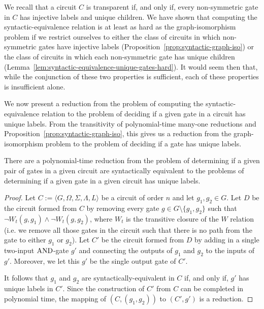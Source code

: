 \documentclass[../main/thesis.tex]{subfiles}
\begin{document}
We recall that a circuit $C$ is transparent if, and only if, every non-symmetric
gate in $C$ has injective labels and unique children. We have shown that
computing the syntactic-equivalence relation is at least as hard as the
graph-isomorphism problem if we restrict ourselves to either the class of
circuits in which non-symmetric gates have injective labels
(Proposition~\ref{prop:syntactic-graph-iso}) or the class of circuits in which
each non-symmetric gate has unique children
(Lemma~\ref{lem:syntactic-equivalence-unique-gates-hard}). It would seem then
that, while the conjunction of these two properties is sufficient, each of these
properties is insufficient alone.

We now present a reduction from the problem of computing the
syntactic-equivalence relation to the problem of deciding if a given gate in a
circuit has unique labels. From the transitivity of polynomial-time many-one
reductions and Proposition~\ref{prop:syntactic-graph-iso}, this gives us a
reduction from the graph-isomorphism problem to the problem of deciding if a
gate has unique labels.

\begin{lem}
  There are a polynomial-time reduction from the problem of determining if a
  given pair of gates in a given circuit are syntactically equivalent to the
  problems of determining if a given gate in a given circuit has unique labels.
  \label{lem:syntactically-equivalent-unique-labels}
\end{lem}

\begin{proof}
  Let $C := \langle G, \Omega, \Sigma, \Lambda, L \rangle$ be a circuit of order
  $n$ and let $g_1, g_2 \in G$. Let $D$ be the circuit formed from $C$ by
  removing every gate $g \in G \setminus\{g_1, g_2\}$ such that $\neg W_t(g,
  g_1) \land \neg W_t(g, g_2)$, where $W_t$ is the transitive closure of the $W$
  relation (i.e. we remove all those gates in the circuit such that there is no
  path from the gate to either $g_1$ or $g_2$). Let $C'$ be the circuit formed
  from $D$ by adding in a single two-input $\text{\upshape AND}$-gate $g'$ and connecting the
  outputs of $g_1$ and $g_2$ to the inputs of $g'$. Moreover, we let this $g'$
  be the single output gate of $C'$.

  It follows that $g_1$ and $g_2$ are syntactically-equivalent in $C$ if, and
  only if, $g'$ has unique labels in $C'$. Since the construction of $C'$ from
  $C$ can be completed in polynomial time, the mapping of $(C, (g_1, g_2))$ to
  $(C', g')$ is a reduction.
\end{proof}
\end{document}
